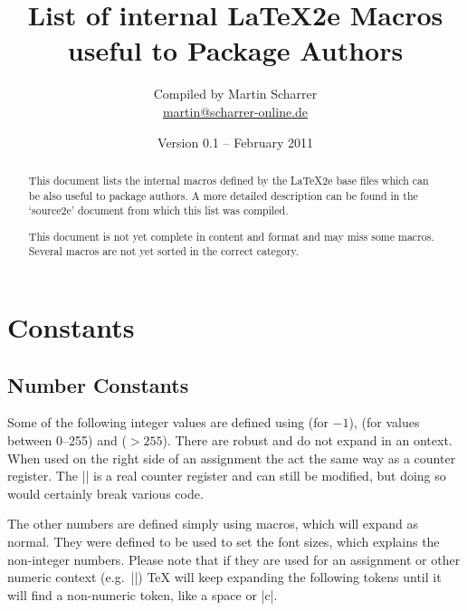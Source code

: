 \documentclass[12pt]{article}
\title{List of internal \LaTeX2e Macros useful to Package Authors}
\author{Compiled by Martin Scharrer\\\url{martin@scharrer-online.de}}
\date{Version 0.1 -- February 2011}
\begin{document}
\maketitle
\begin{abstract}
This document lists the internal macros defined by the \LaTeX2e base files which can be also useful to package authors.
A more detailed description can be found in the `source2e' document from which this list was compiled.

This document is not yet complete in content and format and may miss some macros. Several macros are not yet
sorted in the correct category.
\end{abstract}

\tableofcontents

\clearpage

\section{Constants}

\subsection{Number Constants}

Some of the following integer values are defined using \Macro\countdef\relax (for $-1$), \Macro\chardef\relax (for values between 0--255) and \Macro\mathchardef\relax ($>255$).
There are robust and do not expand in an \Macro\edef\relax context. When used on the right side of an assignment the act the 
same way as a counter register.  The |\m@ne| is a real counter register and can still be modified, but doing so would certainly break various code.

The other numbers are defined simply using macros, which will expand as normal.
They were defined to be used to set the font sizes, which explains the non-integer numbers.
Please note that if they are used for an assignment or other numeric context (e.g.\ |\ifnum|)
TeX will keep expanding the following tokens until it will find a non-numeric token, like a space or |\relax|.
\end{document}

